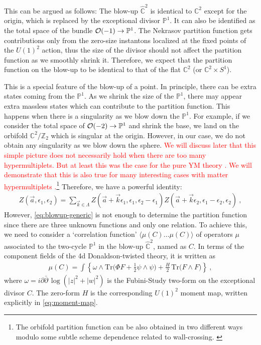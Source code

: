 \documentclass[letterpaper, 11pt]{article}
\def\IC{\mathbb{C}}
\def\IP{\mathbb{P}}
\def\IZ{\mathbb{Z}}
\def\CO{{\cal O}}
\def\e{\epsilon}
\def\half{\frac{1}{2}}
\begin{document}
This can be argued as follows: The blow-up $\hat{\IC}^2$ is identical to $\IC^2$ except for the origin, which is replaced by the exceptional divisor $\IP^1$. It can also be  identified as the total space of the bundle $\CO(-1) \to \IP^1$. 
The Nekrasov partition function gets contributions only from the zero-size instantons localized at the fixed points of the $U(1)^2$ action, thus the size of the divisor should not affect the partition function as we smoothly shrink it. Therefore, we expect that the partition function on the blow-up to be identical to that of the flat $\IC^2$ (or $\IC^2 \times S^1$).

This is a special feature of the blow-up of a point. In principle, there can be extra states coming from the $\IP^1$. As we shrink the size of the $\IP^1$, there may appear extra massless states which can contribute to the partition function. This happens when there is a singularity as we blow down the $\IP^1$. 
For example, if we consider the total space of $\CO(-2) \to \IP^1$ and shrink the base, we land on the orbifold $\IC^2/\IZ_2$ which is singular at the origin. However, in our case, we do not obtain any singularity as we blow down the sphere. \textcolor{red}{We will discuss later that this simple picture does not necessarily hold when there are too many hypermultiplets. But at least this was the case for the pure YM theory \cite{Nakajima:2003pg, Nakajima:2003uh,Nakajima:2005fg,Keller:2012da,Gu:2018gmy,Gu:2019dan}. We will demonstrate that this is also true for many interesting cases with matter hypermultiplets \cite{Gottsche:2010ig}.}\footnote{The orbifold partition function can be also obtained in two different ways modulo some subtle scheme dependence related to wall-crossing. \cite{Ito:2013kpa}} Therefore, we have a powerful identity:
\begin{align} 
  \label{eq:blowup-generic}
  Z(\vec{a}, \e_1, \e_2) = \sum_{\vec{k} \in \Lambda} Z(\vec{a}+ \vec{k} \e_1, \e_1, \e_2 - \e_1) Z(\vec{a}+\vec{k} \e_2, \e_1 - \e_2, \e_2) \ , 
\end{align}
However, \eqref{eq:blowup-generic} is not enough to determine the partition function since there are three unknown functions and only one relation. To achieve this, we need to consider a `correlation function' $\langle \mu(C) \ldots \mu(C)  \rangle$ of operators $\mu$ associated to the two-cycle $\mathbb{P}^1$ in the blow-up $\hat{\mathbb{C}}^2$, named as $C$.  In terms of the component fields of the 4d Donaldson-twisted theory, it is written as  \cite{Witten:1988ze}
\begin{align} \label{eq:muC}
\mu(C) = \int \left\{ \omega \wedge \text{Tr}\Big(\Phi F + \half \psi \wedge \psi\Big) + \frac{H}{2}\, \text{Tr}\Big( F \wedge F \Big) \right\}  \ , 
\end{align}
where $\omega = i\partial\bar{\partial}\,\log(|z|^2+|w|^2)$ is the Fubini-Study two-form on the exceptional divisor $C$. The zero-form $H$ is the corresponding $U(1)^2$ moment map, written explicitly in \eqref{eq:moment-map}.
\end{document}
